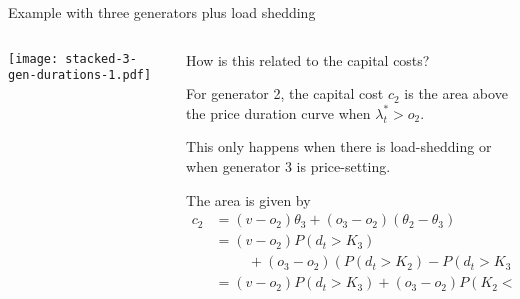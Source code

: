 \documentclass[10pt,aspectratio=169,dvipsnames]{beamer}
\def\l{\lambda}
\begin{document}
\begin{frame}{Example with three generators plus load shedding}

\begin{columns}[T]
  \begin{column}{6cm}

\texttt{[image: stacked-3-gen-durations-1.pdf]}

  \end{column}
  \begin{column}{8cm}

    How is this related to the capital costs?

    \vspace{0.5cm}

    For generator 2, the capital cost $c_2$ is the area above the price duration curve when $\l_t^* > o_2$.

    This only happens when there is load-shedding or when generator 3 is price-setting.

    The area is given by
    \begin{align*}
      c_2 &  = (v - o_2) \theta_3 + (o_3 - o_2) (\theta_2 - \theta_3)  \\
      & = (v - o_2) P(d_t > K_3) \\
       & \hspace{1cm}+ (o_3 - o_2) \left(P(d_t > K_2) - P(d_t > K_3)\right) \\
      & = (v - o_2) P(d_t > K_3) + (o_3 - o_2) P(K_2 < d_t\leq K_3)
    \end{align*}
  \end{column}

\end{columns}

\end{frame}
\end{document}
